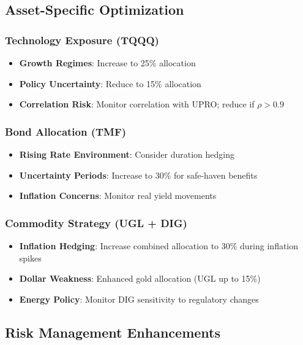 \documentclass[onecolumn,11pt]{IEEEtran}
\begin{document}
\subsection{Asset-Specific Optimization}

\subsubsection{Technology Exposure (TQQQ)}
\begin{itemize}
    \item \textbf{Growth Regimes}: Increase to 25\% allocation
    \item \textbf{Policy Uncertainty}: Reduce to 15\% allocation
    \item \textbf{Correlation Risk}: Monitor correlation with UPRO; reduce if $\rho > 0.9$
\end{itemize}

\subsubsection{Bond Allocation (TMF)}
\begin{itemize}
    \item \textbf{Rising Rate Environment}: Consider duration hedging
    \item \textbf{Uncertainty Periods}: Increase to 30\% for safe-haven benefits
    \item \textbf{Inflation Concerns}: Monitor real yield movements
\end{itemize}

\subsubsection{Commodity Strategy (UGL + DIG)}
\begin{itemize}
    \item \textbf{Inflation Hedging}: Increase combined allocation to 30\% during inflation spikes
    \item \textbf{Dollar Weakness}: Enhanced gold allocation (UGL up to 15\%)
    \item \textbf{Energy Policy}: Monitor DIG sensitivity to regulatory changes
\end{itemize}

\subsection{Risk Management Enhancements}
\end{document}
